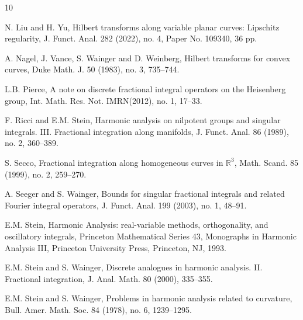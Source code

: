 \documentclass[11pt, twoside, leqno]{article}
\theoremstyle{definition}
\numberwithin{equation}{section}
\begin{document}
\begin{thebibliography}{10}
\vspace{-.3cm}

 N. Liu and H. Yu, Hilbert transforms along variable planar curves: Lipschitz regularity, J. Funct. Anal. 282 (2022), no. 4, Paper No. 109340, 36 pp.

\vspace{-.3cm}

 A. Nagel, J. Vance, S. Wainger and D. Weinberg, Hilbert transforms for convex curves, Duke Math. J. 50 (1983), no. 3, 735--744.

\vspace{-.3cm}

 L.B. Pierce, A note on discrete fractional integral operators on the Heisenberg group, Int. Math. Res. Not. IMRN(2012), no. 1, 17--33.

\vspace{-.3cm}

 F. Ricci and E.M. Stein, Harmonic analysis on nilpotent groups and singular integrals. III. Fractional integration along manifolds, J. Funct. Anal. 86 (1989), no. 2, 360--389.

\vspace{-.3cm}

 S. Secco, Fractional integration along homogeneous curves in ${\mathbb R}^{3}$, Math. Scand. 85 (1999), no. 2, 259--270.

\vspace{-.3cm}

 A. Seeger and S. Wainger, Bounds for singular fractional integrals and related Fourier integral operators, J. Funct. Anal. 199 (2003), no. 1, 48--91.

\vspace{-.3cm}

 E.M. Stein, Harmonic Analysis: real-variable methods, orthogonality, and oscillatory integrals, Princeton Mathematical Series 43, Monographs in Harmonic Analysis III, Princeton University Press, Princeton, NJ, 1993.

\vspace{-.3cm}

 E.M. Stein and S. Wainger, Discrete analogues in harmonic analysis. II. Fractional integration, J. Anal. Math. 80 (2000), 335--355.

\vspace{-.3cm}

 E.M. Stein and S. Wainger, Problems in harmonic analysis related to curvature, Bull. Amer. Math. Soc. 84 (1978), no. 6, 1239--1295.

\end{thebibliography}
\end{document}
